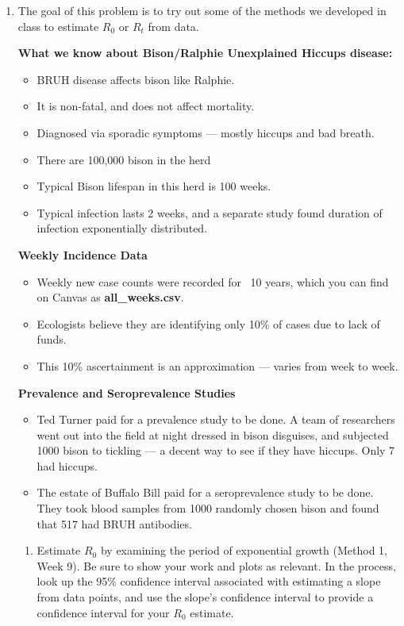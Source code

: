 \documentclass[11pt]{article}
\begin{document}
\begin{enumerate}
	\item The goal of this problem is to try out some of the methods we developed in class to estimate $R_0$ or $R_t$ from data. 
	
	{\bf What we know about Bison/Ralphie Unexplained Hiccups disease:}
	\begin{itemize}[itemsep=-5pt]
	\item BRUH disease affects bison like Ralphie.
	\item It is non-fatal, and does not affect mortality.
	\item Diagnosed via sporadic symptoms — mostly hiccups and bad breath.
	\item There are 100,000 bison in the herd
	\item Typical Bison lifespan in this herd is 100 weeks.
	\item Typical infection lasts 2 weeks, and a separate study found duration of infection exponentially distributed.
	\end{itemize}

	{\bf Weekly Incidence Data}
	\begin{itemize}[itemsep=-5pt]
		\item Weekly new case counts were recorded for ~10 years, which you can find on Canvas as {\bf all\_weeks.csv}.
		\item Ecologists believe they are identifying only 10\% of cases due to lack of funds.
		\item This 10\% ascertainment is an approximation — varies from week to week.
	\end{itemize}

	{\bf Prevalence and Seroprevalence Studies}
	\begin{itemize}[itemsep=-5pt]
		\item Ted Turner paid for a prevalence study to be done. A team of researchers went out into the field at night dressed in bison disguises, and subjected 1000 bison to tickling — a decent way to see if they have hiccups. Only 7 had hiccups. 
		\item The estate of Buffalo Bill paid for a seroprevalence study to be done. They took blood samples from 1000 randomly chosen bison and found that 517 had  BRUH antibodies.
	\end{itemize}
	
\begin{enumerate}[label=\alph*.]
	\item Estimate $R_0$ by examining the period of exponential growth (Method 1, Week 9). Be sure to show your work and plots as relevant. In the process, look up the 95\% confidence interval associated with estimating a slope from data points, and use the slope's confidence interval to provide a confidence interval for your $R_0$ estimate.
	

\end{enumerate}
\end{enumerate}
\end{document}
